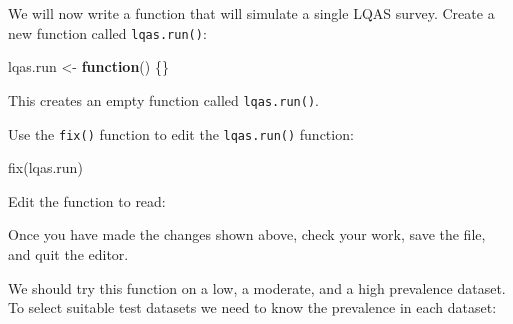 \documentclass[
  12pt,
  a4paper]{book}
\newenvironment{Shaded}{\begin{snugshade}}{\end{snugshade}}
\newcommand{\AttributeTok}[1]{\textcolor[rgb]{0.77,0.63,0.00}{#1}}
\newcommand{\ConstantTok}[1]{\textcolor[rgb]{0.00,0.00,0.00}{#1}}
\newcommand{\ControlFlowTok}[1]{\textcolor[rgb]{0.13,0.29,0.53}{\textbf{#1}}}
\newcommand{\FunctionTok}[1]{\textcolor[rgb]{0.00,0.00,0.00}{#1}}
\newcommand{\NormalTok}[1]{#1}
\newcommand{\OtherTok}[1]{\textcolor[rgb]{0.56,0.35,0.01}{#1}}
\newcommand{\SpecialCharTok}[1]{\textcolor[rgb]{0.00,0.00,0.00}{#1}}
\newcommand{\StringTok}[1]{\textcolor[rgb]{0.31,0.60,0.02}{#1}}
\begin{document}
We will now write a function that will simulate a single LQAS survey. Create a new function called \texttt{lqas.run()}:

\begin{Shaded}
\begin{Highlighting}[]
\NormalTok{lqas.run }\OtherTok{\textless{}{-}} \ControlFlowTok{function}\NormalTok{() \{\}}
\end{Highlighting}
\end{Shaded}

This creates an empty function called \texttt{lqas.run()}.

Use the \texttt{fix()} function to edit the \texttt{lqas.run()} function:

\begin{Shaded}
\begin{Highlighting}[]
\FunctionTok{fix}\NormalTok{(lqas.run)}
\end{Highlighting}
\end{Shaded}

Edit the function to read:

Once you have made the changes shown above, check your work, save the file, and quit the editor.

We should try this function on a low, a moderate, and a high prevalence dataset. To select suitable test datasets we need to know the prevalence in each dataset:

\begin{Shaded}
\end{Shaded}
\end{document}
